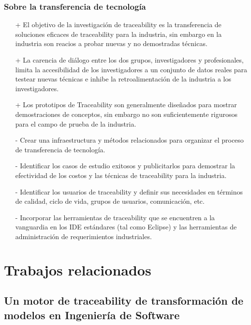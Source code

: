 \documentclass[a4paper,12pt,oneside]{book}
\begin{document}
\subsection{Sobre la transferencia de tecnología}

\begin{itemize}
\item[+]     El objetivo de la investigación de traceability es la transferencia de soluciones eficaces de traceability para la industria, sin embargo en la industria son reacios a probar nuevas y no demostradas técnicas.
\item[+]    La carencia de diálogo entre los dos grupos, investigadores y profesionales, limita la accesibilidad de los investigadores a un conjunto de datos reales para testear nuevas técnicas e inhibe la retroalimentación de la industria a los investigadores.
\item[+]    Los prototipos de Traceability son generalmente diseñados para mostrar demostraciones de conceptos, sin embargo no son suficientemente rigurosos para el campo de prueba de la industria.
\end{itemize}

\begin{itemize}
\item[-]     Crear una infraestructura y métodos relacionados para organizar el proceso de transferencia de tecnología.
\item[-]    Identificar los casos de estudio exitosos y publicitarlos para demostrar la efectividad de los costos y las técnicas de traceability para la industria.
\item[-]    Identificar los usuarios de traceability y definir sus necesidades en términos de calidad, ciclo de vida, grupos de usuarios, comunicación, etc.
\item[-]    Incorporar las herramientas de traceability que se encuentren a la vanguardia en los IDE estándares (tal como Eclipse) y las herramientas de administración de requerimientos industriales.
\end{itemize}


\chapter{Trabajos relacionados}

\section{Un motor de traceability de transformación de modelos en Ingeniería de Software}
\end{document}
